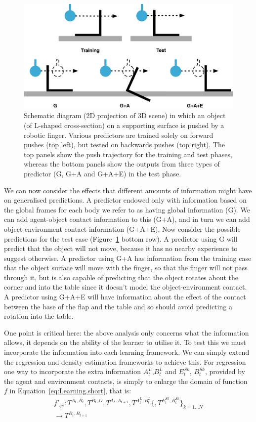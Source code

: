 \begin{figure}[b]
\centerline{\includegraphics[width=0.8\columnwidth]{BackPushToyExample}}
\caption[ToyExample]{Schematic diagram (2D projection of 3D scene)
in which an object (of L-shaped cross-section) on a supporting surface
is pushed by a robotic finger. 
Various predictors are trained solely on forward pushes (top left), but tested on backwards pushes (top right). The top panels show the push trajectory for the training and test phases, whereas the bottom panels show the outputs from three types of predictor (G, G+A and G+A+E) in the test phase.}
\label{fig:ToyExample}
\end{figure}

We can now consider the effects that different amounts of information
might have on generalised predictions. A predictor endowed only with
information based on the global frames for each body we refer to as
having global information (G). We can add agent-object contact
information to this (G+A), and in turn we can add object-environment
contact information (G+A+E). Now consider the possible predictions for
the test case (Figure~\ref{fig:ToyExample} bottom row). A predictor
using G will predict that the object will not move, because it has no
nearby experience to suggest otherwise. A predictor using G+A has
information from the training case that the object surface will move
with the finger, so that the finger will not pass through it, but is
also capable of predicting that the object rotates about the corner
and into the table since it doesn't model the object-environment
contact. A predictor using G+A+E will have information about the
effect of the contact between the base of the flap and the table and
so should avoid predicting a rotation into the table.

One point is critical here: the above analysis only concerns what the
information allows, it depends on the ability of the learner to
utilise it.  To test this we must incorporate the information into
each learning framework. We can simply extend the regression and density
estimation frameworks to achieve this. For regression one way to
incorporate the extra information $A^{L}_{t}$,$B^{L}_{t}$ and
$E^{Sk}_t$\hspace{-6pt}, $B^{Sk}_t$, provided by the agent and
environment contacts, is simply to enlarge the domain of function~$f$
in Equation~\eqref{eq:Learning.short}, that is:
\begin{multline}
f'_{qs}: T^{A_t, B_t}, T^{B_t, O}, T^{A_{t}, A_{t+1}}, T^{A^{L}_t, B^{L}_t}\{, T^{E^{Sk}_t,B^{Sk}_t}\}_{k=1 \ldots N} \\ 
\longrightarrow T^{B_{t}, B_{t+1}}
\label{eq:Learning.augmented}
\end{multline}

